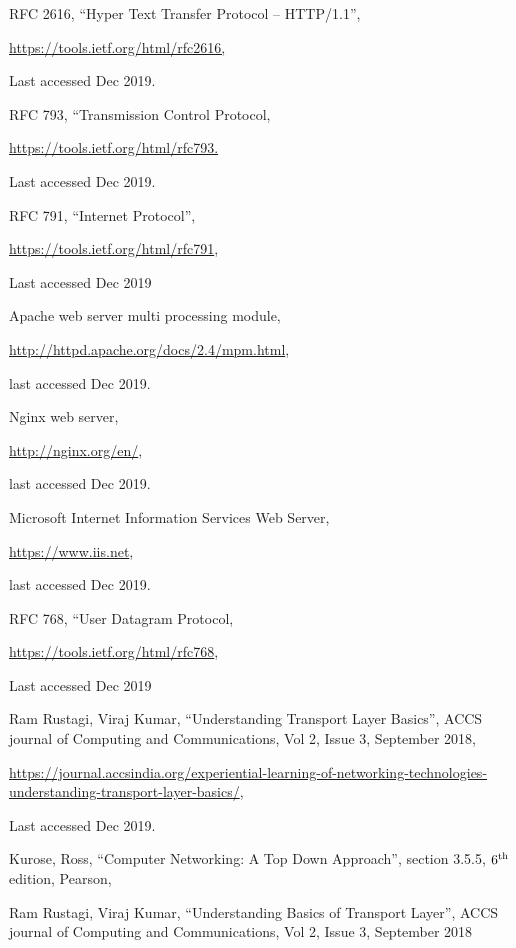 \begin{multicols}{2}
\vspace{-.3cm}

\begin{thebibliography}{99}
 RFC 2616, “Hyper Text Transfer Protocol – HTTP/1.1”,

\url{https://tools.ietf.org/html/rfc2616,}

Last accessed Dec 2019.

 RFC 793, “Transmission Control Protocol,

\url{https://tools.ietf.org/html/rfc793.}

Last accessed Dec 2019.

 RFC 791, “Internet Protocol”,

\url{https://tools.ietf.org/html/rfc791},

Last accessed Dec 2019

 Apache web server multi processing module,

\url{http://httpd.apache.org/docs/2.4/mpm.html},

last accessed Dec 2019.

 Nginx web server,

\url{http://nginx.org/en/},

last accessed Dec 2019.

 Microsoft Internet Information Services Web Server,

\url{https://www.iis.net},

last accessed Dec 2019.

 RFC 768, “User Datagram Protocol,

\url{https://tools.ietf.org/html/rfc768},

Last accessed Dec 2019

  Ram Rustagi, Viraj Kumar, “Understanding Transport Layer Basics”, ACCS journal of Computing and Communications, Vol 2, Issue 3, September 2018,

\url{https://journal.accsindia.org/experiential-learning-of-networking-technologies-understanding-transport-layer-basics/},

Last accessed Dec 2019.

 Kurose, Ross, “Computer Networking: A Top Down Approach”, section 3.5.5, $6^{\rm th}$ edition, Pearson,

 Ram Rustagi, Viraj Kumar, “Understanding Basics of Transport Layer”, ACCS journal of Computing and Communications, Vol 2, Issue 3, September 2018


\end{thebibliography}
\end{multicols}

